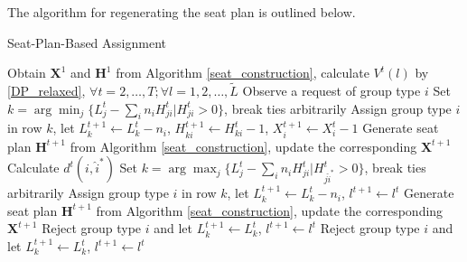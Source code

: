 The algorithm for regenerating the seat plan is outlined below.

\begin{algorithm}[H]
  \caption{Seat-Plan-Based Assignment}
  Obtain $\bm{X}^{1}$ and $\bm{H}^{1}$ from Algorithm \ref{seat_construction}, calculate $V^{t}(l)$ by \eqref{DP_relaxed}, $\forall t =2, \ldots, T; \forall l = 1,2, \ldots, \tilde{L}$\;
  {Observe a request of group type ${i}$\;
    {
    {Set $k = \arg \min_{j} \{L_j^{t} - \sum_{i}n_i H^{t}_{ji}|H^{t}_{ji} >0\}$, break ties arbitrarily\; 
     Assign group type $i$ in row $k$, let $L_{k}^{t+1} \gets L_{k}^{t}- n_{i}$, $H_{ki}^{t+1} \gets H_{ki}^{t}-1$, $X_{i}^{t+1}\gets X_{i}^{t}-1$\;
    {Generate seat plan $\bm{H}^{t+1}$ from Algorithm \ref{seat_construction}, update the corresponding $\bm{X}^{t+1}$\;}}
    {Calculate $d^{t}({i}, \hat{i}^{*})$\;
    {Set $k = \arg \max_{j} \{L_j^{t} - \sum_{i}n_i H_{ji}^{t}|H_{j\hat{i}^{*}}^{t} >0\}$, break ties arbitrarily\;
     Assign group type $i$ in row $k$, let $L_{k}^{t+1} \gets L_{k}^{t}- n_{i}$, $l^{t+1} \gets l^{t}$\;
    Generate seat plan $\bm{H}^{t+1}$ from Algorithm \ref{seat_construction}, update the corresponding $\bm{X}^{t+1}$\;}
    {Reject group type ${i}$ and let $L_{k}^{t+1} \gets L_{k}^{t}$, $l^{t+1} \gets l^{t}$\;}}}
    {Reject group type ${i}$ and let $L_{k}^{t+1} \gets L_{k}^{t}$, $l^{t+1} \gets l^{t}$\;}}
\end{algorithm}

